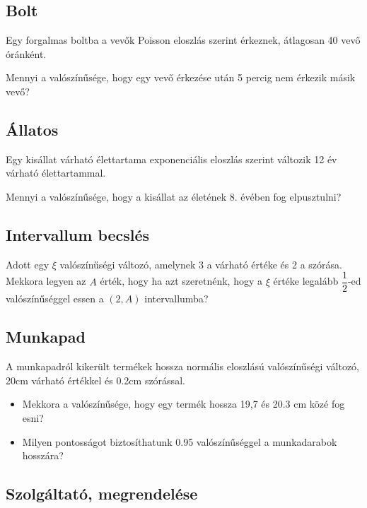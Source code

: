 \documentclass[a4paper]{article}
\begin{document}
\subsection{Bolt}

Egy forgalmas boltba a vevők Poisson eloszlás szerint érkeznek, átlagosan 40 vevő óránként.

\medskip

Mennyi a valószínűsége, hogy egy vevő érkezése után 5 percig nem érkezik másik vevő?

\subsection{Állatos}

Egy kisállat várható élettartama exponenciális eloszlás szerint változik 12 év várható élettartammal.

\medskip

Mennyi a valószínűsége, hogy a kisállat az életének 8. évében fog elpusztulni?


\subsection{Intervallum becslés}

Adott egy $\xi$ valószínűségi változó, amelynek 3 a várható értéke és 2 a szórása.
Mekkora legyen az $A$ érték, hogy ha azt szeretnénk, hogy a $\xi$ értéke legalább $\dfrac{1}{2}$-ed valószínűséggel essen a $(2, A)$ intervallumba?


\subsection{Munkapad}

A munkapadról kikerült termékek hossza normális eloszlású valószínűségi változó, 20cm várható értékkel és 0.2cm szórással.
\begin{itemize}
\item Mekkora a valószínűsége, hogy egy termék hossza 19,7 és 20.3 cm közé fog esni?
\item Milyen pontosságot biztosíthatunk 0.95 valószínűséggel a munkadarabok hosszára?
\end{itemize}

\subsection{Szolgáltató, megrendelése}
\end{document}
